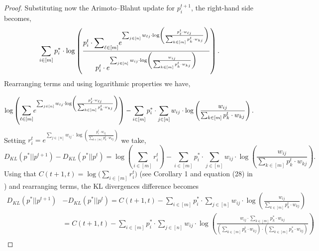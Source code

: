 \documentclass[11pt, letterpaper]{article}
\begin{document}
\begin{proof}
\noindent Substituting now the Arimoto–Blahut update for $p^{t+1}_i$, the right-hand side becomes,
\begin{equation*}
    \sum_{i \in [m]} p^*_i \cdot  \log\left(\frac{p^t_i \cdot \mathlarger{\sum}\nolimits_{\ell \in [m]} e^{\sum_{j \in [n]} w_{\ell j} \cdot  \log\left(\frac{p^t_{\ell} \cdot w_{\ell j} }{\sum_{k \in [m]} p^t_k \cdot w_{kj}}\right)}}{p^t_i \cdot e^{ \sum_{j \in [n]} w_{ij} \cdot  \log\left(\frac{w_{ij}}{\sum_{k \in [m]} p^t_k \cdot w_{kj}}\right)}}\right).
\end{equation*}
Rearranging terms and using logarithmic properties we have,

\begin{equation*}
    \log\left(\mathlarger{\sum}_{\ell \in [m]} e^{\sum_{j \in [n]} w_{\ell j} \cdot  \log\left(\frac{p^t_{\ell} \cdot w_{\ell j} }{\sum_{k \in [m]} p^t_k \cdot w_{kj}}\right)}\right) - \sum_{i \in [m]} p^*_i \cdot  \sum_{j \in [n]} w_{ij} \cdot  \log\left(\frac{w_{ij}}{\sum_{k \in [m]} p^t_k \cdot w_{kj}}\right).
\end{equation*}
Setting $r^t_i = e^{\sum_{j \in [n]} w_{ij} \cdot  \log\left(\frac{p^t_{i} \cdot w_{ij} }{\sum_{k \in [m]} p^t_k \cdot w_{k j}}\right)}$ we take,
\begin{equation*}
    D_{KL}(p^*||p^{t+1}) - D_{KL}(p^*||p^{t})
    = \log\left(\sum_{i \in [m]} r^t_i\right) - \sum_{i \in [m]} p^*_i \cdot  \sum_{j \in [n]} w_{ij} \cdot  \log\left(\frac{w_{ij}}{\sum_{k \in [m]} p^t_k \cdot w_{kj}}\right).
\end{equation*}
Using that $C(t+1,t) = \log \Big(\sum\nolimits_{i \in [m]} r^t_i \Big)$ (see Corollary 1 and equation (28) in \cite{Arimoto1972AnAF}) and rearranging terms, the KL divergences difference becomes
\begin{equation*}
\begin{split}
    D_{KL}(p^* ||p^{t+1}) & - D_{KL}(p^*||p^{t}) = C(t+1,t) - \sum_{i \in [m]} p^*_i \cdot  \sum_{j \in [n]} w_{ij} \cdot  \log\left(\frac{w_{ij}}{\sum_{k \in [m]} p^t_k \cdot w_{kj}}\right)\\
    &= C(t+1,t) - \sum_{i \in [m]} p^*_i \cdot  \sum_{j \in [n]} w_{ij} \cdot  \log\left(\frac{w_{ij} \cdot \sum_{k \in [m]} p^*_k \cdot w_{kj}}{\left(\sum_{k \in [m]} p^t_k \cdot w_{kj}\right)\cdot \left(\sum_{k \in [m]} p^*_k \cdot w_{kj}\right)}\right)\\ 

\end{split}
\end{equation*}
\end{proof}
\end{document}
